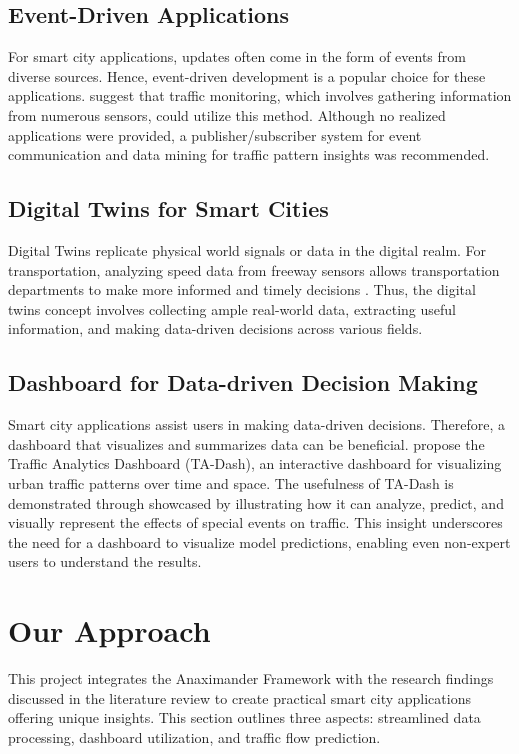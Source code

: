 \documentclass[12pt]{article}
\begin{document}
\subsection{Event-Driven Applications}
 For smart city applications, updates often come in the form of events from diverse sources. Hence, event-driven development is a popular choice for these applications. \citet{hinze2009event} suggest that traffic monitoring, which involves gathering information from numerous sensors, could utilize this method. Although no realized applications were provided, a publisher/subscriber system for event communication and data mining for traffic pattern insights was recommended.

\subsection{Digital Twins for Smart Cities}
 Digital Twins replicate physical world signals or data in the digital realm. For transportation, analyzing speed data from freeway sensors allows transportation departments to make more informed and timely decisions \autocite{hu2021digital}. Thus, the digital twins concept involves collecting ample real-world data, extracting useful information, and making data-driven decisions across various fields.

\subsection{Dashboard for Data-driven Decision Making}
 Smart city applications assist users in making data-driven decisions. Therefore, a dashboard that visualizes and summarizes data can be beneficial. \citet{tempelmeier2020ta} propose the Traffic Analytics Dashboard (TA-Dash), an interactive dashboard for visualizing urban traffic patterns over time and space. The usefulness of TA-Dash is demonstrated through showcased by illustrating how it can analyze, predict, and visually represent the effects of special events on traffic. This insight underscores the need for a dashboard to visualize model predictions, enabling even non-expert users to understand the results.

\section{Our Approach}
 This project integrates the Anaximander Framework with the research findings discussed in the literature review to create practical smart city applications offering unique insights. This section outlines three aspects: streamlined data processing, dashboard utilization, and traffic flow prediction.
\end{document}
